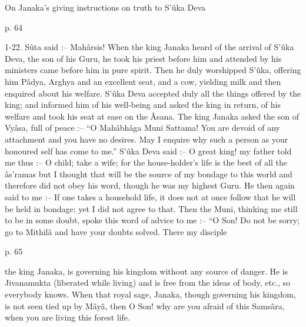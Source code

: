 On Janaka’s giving instructions on truth to S’ûka Deva

 

p. 64

 

1-22. Sûta said :-- Mahârsis! When the king Janaka heard of the arrival of S’ûka Deva, the son of his Guru, he took his priest before him and attended by his ministers came before him in pure spirit. Then he duly worshipped S’ûka, offering him Pâdya, Arghya and an excellent seat, and a cow, yielding milk and then enquired about his welfare. S’ûka Deva accepted duly all the things offered by the king; and informed him of his well-being and asked the king in return, of his welfare and took his seat at ease on the Âsana. The king Janaka asked the son of Vyâsa, full of peace :-- “O Mahâbhâga Muni Sattama! You are devoid of any attachment and you have no desires. May I enquire why such a person as your honoured self has come to me.” S’ûka Deva said :-- O great king! my father told me thus :-- O child; take a wife; for the house-holder's life is the best of all the âs'ramas but I thought that will be the source of my bondage to this world and therefore did not obey his word, though he was my highest Guru. He then again said to me :-- If one takes a household life, it does not at once follow that he will be held in bondage; yet I did not agree to that. Then the Muni, thinking me still to be in some doubt, spoke this word of advice to me :-- “O Son! Do not be sorry; go to Mithilâ and have your doubts solved. There my disciple

 

p. 65

 

the king Janaka, is governing his kingdom without any source of danger. He is Jivanamukta (liberated while living) and is free from the ideas of body, etc., so everybody knows. When that royal sage, Janaka, though governing his kingdom, is not seen tied up by Mâyâ, then O Son! why are you afraid of this Samsâra, when you are living this forest life.

 

